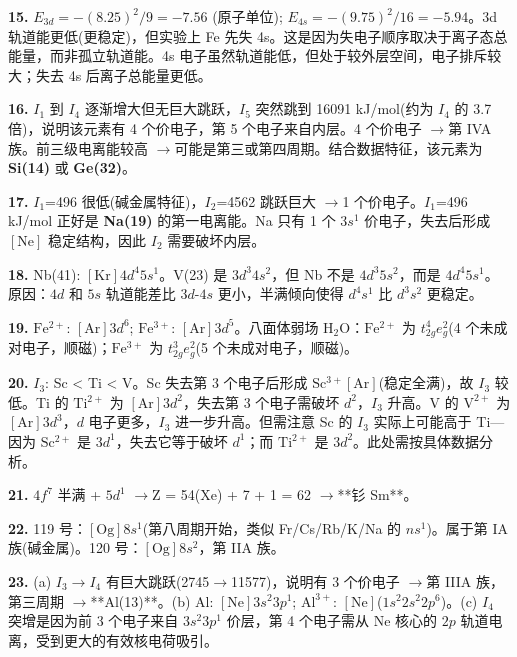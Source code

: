 \documentclass[a4paper,11pt]{ctexart}
\newcommand{\箭}{\ensuremath{\rightarrow}}
\newcommand{\左箭}{\ensuremath{\leftarrow}}
\newcommand{\上箭}{\ensuremath{\uparrow}}
\newcommand{\下箭}{\ensuremath{\downarrow}}
\newcommand{\衡}{\ensuremath{\rightleftharpoons}}
\newcommand{\双箭}{\ensuremath{\leftrightarrow}}
\newcommand{\约等于}{\ensuremath{\approx}}
\newcommand{\小于等于}{\ensuremath{\leq}}
\newcommand{\大于等于}{\ensuremath{\geq}}
\newcommand{\不等于}{\ensuremath{\neq}}
\newcommand{\西格马}{\ensuremath{\sigma}}
\newcommand{\派}{\ensuremath{\pi}}
\begin{document}
\textbf{15.} \(E_{3d} = -(8.25)^2/9 = -7.56\) (原子单位); \(E_{4s} = -(9.75)^2/16 = -5.94\)。3d 轨道能更低(更稳定)，但实验上 Fe 先失 4s。这是因为失电子顺序取决于离子态总能量，而非孤立轨道能。4s 电子虽然轨道能低，但处于较外层空间，电子排斥较大；失去 4s 后离子总能量更低。

\textbf{16.} \(I_1\) 到 \(I_4\) 逐渐增大但无巨大跳跃，\(I_5\) 突然跳到 16091 kJ/mol(约为 \(I_4\) 的 3.7 倍)，说明该元素有 4 个价电子，第 5 个电子来自内层。4 个价电子 \箭 第 IVA 族。前三级电离能较高 \箭 可能是第三或第四周期。结合数据特征，该元素为 \textbf{Si(14)} 或 \textbf{Ge(32)}。

\textbf{17.} \(I_1\)=496 很低(碱金属特征)，\(I_2\)=4562 跳跃巨大 \箭 1 个价电子。\(I_1\)=496 kJ/mol 正好是 \textbf{Na(19)} 的第一电离能。Na 只有 1 个 \(3s^1\) 价电子，失去后形成 \([\mathrm{Ne}]\) 稳定结构，因此 \(I_2\) 需要破坏内层。

\textbf{18.} Nb(41): \([\mathrm{Kr}]4d^4 5s^1\)。V(23) 是 \(3d^3 4s^2\)，但 Nb 不是 \(4d^3 5s^2\)，而是 \(4d^4 5s^1\)。原因：\(4d\) 和 \(5s\) 轨道能差比 \(3d\)-\(4s\) 更小，半满倾向使得 \(d^4 s^1\) 比 \(d^3 s^2\) 更稳定。

\textbf{19.} \(\mathrm{Fe^{2+}}\): \([\mathrm{Ar}]3d^6\); \(\mathrm{Fe^{3+}}\): \([\mathrm{Ar}]3d^5\)。八面体弱场 \(\mathrm{H_2O}\)：\(\mathrm{Fe^{2+}}\) 为 \(t_{2g}^4 e_g^2\)(4 个未成对电子，顺磁)；\(\mathrm{Fe^{3+}}\) 为 \(t_{2g}^3 e_g^2\)(5 个未成对电子，顺磁)。

\textbf{20.} \(I_3\): Sc \textless{} Ti \textless{} V。Sc 失去第 3 个电子后形成 \(\mathrm{Sc^{3+}} [\mathrm{Ar}]\)(稳定全满)，故 \(I_3\) 较低。Ti 的 \(\mathrm{Ti^{2+}}\) 为 \([\mathrm{Ar}]3d^2\)，失去第 3 个电子需破坏 \(d^2\)，\(I_3\) 升高。V 的 \(\mathrm{V^{2+}}\) 为 \([\mathrm{Ar}]3d^3\)，\(d\) 电子更多，\(I_3\) 进一步升高。但需注意 Sc 的 \(I_3\) 实际上可能高于 Ti---因为 \(\mathrm{Sc^{2+}}\) 是 \(3d^1\)，失去它等于破坏 \(d^1\)；而 \(\mathrm{Ti^{2+}}\) 是 \(3d^2\)。此处需按具体数据分析。

\textbf{21.} \(4f^7\) 半满 + \(5d^1\) \箭 Z = 54(Xe) + 7 + 1 = 62 \箭 **钐 Sm**。

\textbf{22.} 119 号：\([\mathrm{Og}]8s^1\)(第八周期开始，类似 Fr/Cs/Rb/K/Na 的 \(ns^1\))。属于第 IA 族(碱金属)。120 号：\([\mathrm{Og}]8s^2\)，第 IIA 族。

\textbf{23.} (a) \(I_3\)\箭\(I_4\) 有巨大跳跃(2745\箭11577)，说明有 3 个价电子 \箭 第 IIIA 族，第三周期 \箭 **Al(13)**。(b) Al: \([\mathrm{Ne}]3s^2 3p^1\); \(\mathrm{Al^{3+}}\): \([\mathrm{Ne}]\)(\(1s^2 2s^2 2p^6\))。(c) \(I_4\) 突增是因为前 3 个电子来自 \(3s^2 3p^1\) 价层，第 4 个电子需从 \(\mathrm{Ne}\) 核心的 \(2p\) 轨道电离，受到更大的有效核电荷吸引。
\end{document}
